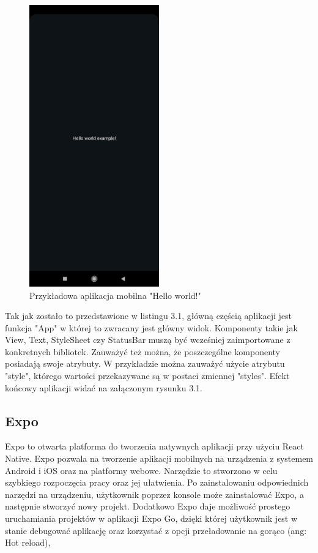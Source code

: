 \documentclass[a4paper,12pt,oneside]{book}
\begin{document}
	\begin{figure}[H]
		\centering
		\includegraphics[width=0.5\textwidth]{grafika/hello_world.jpg}
		\caption{Przykładowa aplikacja mobilna "Hello world!"}
	\end{figure}

	Tak jak zostało to przedstawione w listingu 3.1, główną częścią aplikacji jest funkcja "App" w której to zwracany jest główny widok. Komponenty takie jak View, Text, StyleSheet czy StatusBar muszą być wcześniej zaimportowane z konkretnych bibliotek. Zauważyć też można, że poszczególne komponenty posiadają swoje atrybuty. W przykładzie można zauważyć użycie atrybutu "style", którego wartości przekazywane są w postaci zmiennej "styles". Efekt końcowy aplikacji widać na załączonym rysunku 3.1.
	
	\subsection{Expo}
	Expo to otwarta platforma do tworzenia natywnych aplikacji przy użyciu React Native. Expo pozwala na tworzenie aplikacji mobilnych na urządzenia z systemem Android i iOS oraz na platformy webowe. Narzędzie to stworzono w celu szybkiego rozpoczęcia pracy oraz jej ułatwienia. Po zainstalowaniu odpowiednich narzędzi na urządzeniu, użytkownik poprzez konsole może zainstalować Expo, a następnie stworzyć nowy projekt. Dodatkowo Expo daje możliwość prostego uruchamiania projektów w aplikacji Expo Go, dzięki której użytkownik jest w stanie debugować aplikację oraz korzystać z opcji przeładowanie na gorąco (ang: Hot reload),
	
\end{document}
